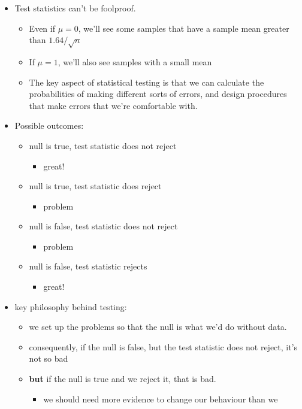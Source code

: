 \begin{itemize}
\item Test statistics can't be foolproof.
\begin{itemize}
\item Even if $\mu = 0$, we'll see some samples that have a sample
         mean greater than $1.64 / \sqrt{n}$
\item If $\mu = 1$, we'll also see samples with a small mean
\item The key aspect of statistical testing is that we can calculate
         the probabilities of making different sorts of errors, and
         design procedures that make errors that we're comfortable with.
\end{itemize}
\item Possible outcomes:
\begin{itemize}
\item null is true, test statistic does not reject
\begin{itemize}
\item great!
\end{itemize}
\item null is true, test statistic does reject
\begin{itemize}
\item problem
\end{itemize}
\item null is false, test statistic does not reject
\begin{itemize}
\item problem
\end{itemize}
\item null is false, test statistic rejects
\begin{itemize}
\item great!
\end{itemize}
\end{itemize}
\item key philosophy behind testing:
\begin{itemize}
\item we set up the problems so that the null is what we'd do
         without data.
\item consequently, if the null is false, but the test statistic
         does not reject, it's not so bad
\item \textbf{but} if the null is true and we reject it, that is bad.
\begin{itemize}
\item we should need more evidence to change our behaviour than we

\end{itemize}
\end{itemize}
\end{itemize}
